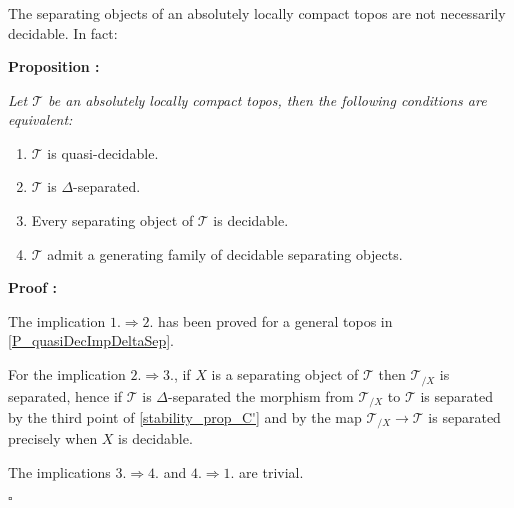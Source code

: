 \documentclass[a4paper]{article}
\newcommand{\Tcal}{\mathcal{T}}
\newcommand{\block}[1]
{

\par \subsubsection{} #1

\bigskip}
\newcommand{\Prop}[1]
	{

	\bigskip
	
	\textbf{Proposition : }{\itshape #1}
		
	\bigskip
	
	}
\newcommand{\Dem}[1]{
	
	\smallskip
	
	\textbf{Proof : } \par
	 {#1} $\square$
	 
	 \bigskip
}
\begin{document}
\block{\label{P_DeltaSepvsAbslocSep} The separating objects of an absolutely locally compact topos are not necessarily decidable. In fact:

\Prop{Let $\Tcal$ be an absolutely locally compact topos, then the following conditions are equivalent:

\begin{enumerate}

\item $\Tcal$ is quasi-decidable.

\item $\Tcal$ is $\Delta$-separated.

\item Every separating object of $\Tcal$ is decidable.

\item $\Tcal$ admit a generating family of decidable separating objects.

\end{enumerate}

}

\Dem{The implication $1. \Rightarrow 2.$ has been proved for a general topos in \ref{P_quasiDecImpDeltaSep}.

For the implication $2. \Rightarrow 3.$, if $X$ is a separating object of $\Tcal$ then $\Tcal_{/X}$ is separated, hence if $\Tcal$ is $\Delta$-separated the morphism from $\Tcal_{/X}$ to $\Tcal$ is separated by the third point of \ref{stability_prop_C'} and by \cite[II.1.3]{moerdijk2000proper} the map $\Tcal_{/X} \rightarrow \Tcal$ is separated precisely when $X$ is decidable.

The implications $3. \Rightarrow 4.$ and $4. \Rightarrow 1.$ are trivial. }

}
\end{document}
